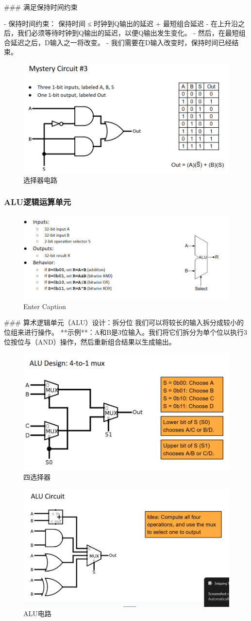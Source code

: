 \documentclass{ctexart}
\begin{document}
### 满足保持时间约束 \par
- 保持时间约束：  
保持时间 ≤ 时钟到Q输出的延迟 + 最短组合延迟  
    - 在上升沿之后，我们必须等待时钟到Q输出的延迟，以便Q输出发生变化。  
    - 然后，在最短组合延迟之后，D输入之一将改变。  
    - 我们需要在D输入改变时，保持时间已经结束。 
    \begin{figure}
        \centering
        \includegraphics[width=0.5\linewidth]{选择器电路.png}
        \caption{选择器电路}
        \label{fig:enter-label}
    \end{figure}
    \subsubsection{ALU逻辑运算单元}
    \begin{figure}
        \centering
        \includegraphics[width=0.5\linewidth]{ALU简图.png}
        \caption{Enter Caption}
        \label{fig:enter-label}
    \end{figure}
    



### 算术逻辑单元（ALU）设计：拆分位  
我们可以将较长的输入拆分成较小的位组来进行操作。  
**示例**：A和B是3位输入。我们将它们拆分为单个位以执行3位按位与（AND）操作，然后重新组合结果以生成输出。 \par
\begin{figure}
    \centering
    \includegraphics[width=0.5\linewidth]{四选择器.png}
    \caption{四选择器}
    \label{fig:enter-label}
\end{figure}
\begin{figure}
    \centering
    \includegraphics[width=0.5\linewidth]{ALU电路.png}
    \caption{ALU电路}
    \label{fig:enter-label}
\end{figure}
\end{document}

